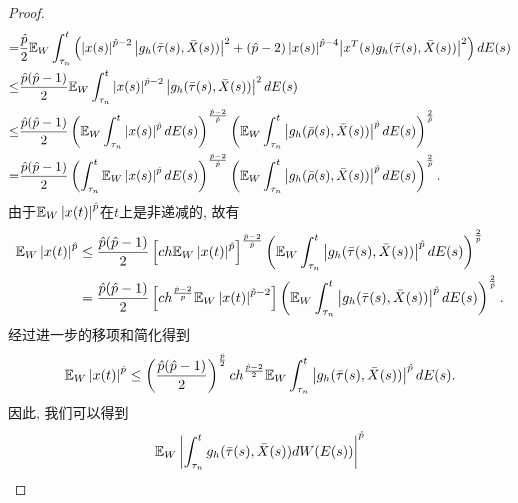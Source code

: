 \begin{proof}
\begin{align*}
    =&\dfrac{\hat{p}}{2}\mathbb{E}_W\int_{\tau_n}^{t}\left(\left| x(s)\right|^{\hat{p}-2}\big|{g_{h}(\bar{\tau}(s),\bar{X}(s))\big|^{2}+({\hat{p}-2})\left| x(s)\right|^{\hat{p}-4}}\big|x^{T}(s)g_{h}(\bar{\tau}(s),\bar{X}(s))\big|^{2}\right)dE(s)\nonumber\\ 
    \leq& \frac{\hat{p}(\hat{p}-1)}{2}\mathbb{E}_W\int_{\tau_n}^{t}\left| x(s)\right|^{\hat{p}-2}\left|g_{h}(\bar{\tau}(s),\bar{X}(s))\right|^2dE(s)\\
    \leq& \frac{\hat{p}(\hat{p}-1)}{2}\left(\mathbb{E}_W\int_{\tau_n}^{t}\left| x(s)\right|^{\hat{p}}dE(s)\right)^{\frac{\hat{p}-2}{\hat{p}}}\left(\mathbb{E}_W\int_{\tau_n}^{t}\left|g_{h}(\bar{\rho}(s),\bar{X}(s))\right|^{\hat{p}}dE(s)\right)^{\frac{2}{\hat{p}}}\\
    =&  \frac{\hat{p}(\hat{p}-1)}{2}\left(\int_{\tau_n}^{t}\mathbb{E}_W\left| x(s)\right|^{\hat{p}}dE(s)\right)^{\frac{\hat{p}-2}{\hat{p}}}\left(\mathbb{E}_W\int_{\tau_n}^{t}\left|g_{h}(\bar{\rho}(s),\bar{X}(s))\right|^{\hat{p}}dE(s)\right)^{\frac{2}{\hat{p}}}.
\end{align*}
由于$\mathbb{E}_W\left| x(t)\right|^{\hat{p}}$在$t$上是非递减的, 故有
  \begin{align*}
    \begin{split}
        \mathbb{E}_W\left| x(t)\right|^{\hat{p}}
        &\leq \frac{\hat{p}(\hat{p}-1)}{2}\left[ch\mathbb{E}_W\left| x(t)\right|^{\hat{p}}\right]^{\frac{\hat{p}-2}{\hat{p}}}\left(\mathbb{E}_W\int_{\tau_n}^{t}\left|g_{h}(\bar{\tau}(s),\bar{X}(s))\right|^{\hat{p}}dE(s)\right)^{\frac{2}{\hat{p}}}\\
        &= \frac{\hat{p}(\hat{p}-1)}{2}\left[ch^{\frac{\hat{p}-2}{p}}\mathbb{E}_W\left| x(t)\right|^{\hat{p}-2}\right]\left(\mathbb{E}_W\int_{\tau_n}^{t}\left|g_{h}(\bar{\tau}(s),\bar{X}(s))\right|^{\hat{p}}dE(s)\right)^{\frac{2}{\hat{p}}}.
    \end{split}
\end{align*}
经过进一步的移项和简化得到
 \begin{align*}
    \begin{split}
        \mathbb{E}_W\left| x(t)\right|^{\hat{p}}
        \leq \left(\frac{\hat{p}(\hat{p}-1)}{2}\right)^{\frac{\hat{p}}{2}}ch^{\frac{\hat{p}-2}{2}}\mathbb{E}_W\int_{\tau_n}^{t}\left|g_{h}(\bar{\tau}(s),\bar{X}(s))\right|^{\hat{p}}dE(s).\\
    \end{split}
\end{align*}
因此, 我们可以得到
\begin{align}
    \label{lem39}
    &\EE_W\left|\int_{\tau_n}^{t}{g_{h}(\bar{\tau}(s),\bar{X}(s)) dW(E(s))}\right|^{\hat{p}}\nonumber\\

\end{align}
\end{proof}
